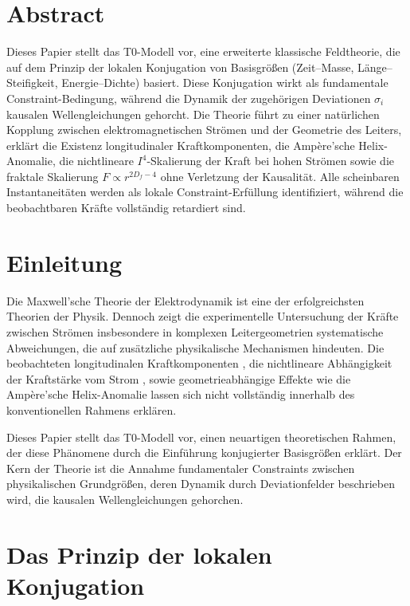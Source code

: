 \section*{Abstract}
		Dieses Papier stellt das T0-Modell vor, eine erweiterte klassische Feldtheorie, die auf dem Prinzip der lokalen Konjugation von Basisgrößen (Zeit--Masse, Länge--Steifigkeit, Energie--Dichte) basiert. Diese Konjugation wirkt als fundamentale Constraint-Bedingung, während die Dynamik der zugehörigen Deviationen $\sigma_i$ kausalen Wellengleichungen gehorcht. Die Theorie führt zu einer natürlichen Kopplung zwischen elektromagnetischen Strömen und der Geometrie des Leiters, erklärt die Existenz longitudinaler Kraftkomponenten, die Ampère'sche Helix-Anomalie, die nichtlineare $I^4$-Skalierung der Kraft bei hohen Strömen sowie die fraktale Skalierung $F \propto r^{2D_f - 4}$ ohne Verletzung der Kausalität. Alle scheinbaren Instantaneitäten werden als lokale Constraint-Erfüllung identifiziert, während die beobachtbaren Kräfte vollständig retardiert sind.

	
	\section{Einleitung}
	Die Maxwell'sche Theorie der Elektrodynamik ist eine der erfolgreichsten Theorien der Physik. Dennoch zeigt die experimentelle Untersuchung der Kräfte zwischen Strömen insbesondere in komplexen Leitergeometrien systematische Abweichungen, die auf zusätzliche physikalische Mechanismen hindeuten. Die beobachteten longitudinalen Kraftkomponenten \cite{graneau1985}, die nichtlineare Abhängigkeit der Kraftstärke vom Strom \cite{graneau2001}, sowie geometrieabhängige Effekte wie die Ampère'sche Helix-Anomalie \cite{moore1988} lassen sich nicht vollständig innerhalb des konventionellen Rahmens erklären.
	
	Dieses Papier stellt das T0-Modell vor, einen neuartigen theoretischen Rahmen, der diese Phänomene durch die Einführung konjugierter Basisgrößen erklärt. Der Kern der Theorie ist die Annahme fundamentaler Constraints zwischen physikalischen Grundgrößen, deren Dynamik durch Deviationfelder beschrieben wird, die kausalen Wellengleichungen gehorchen.
	
	\section{Das Prinzip der lokalen Konjugation}
